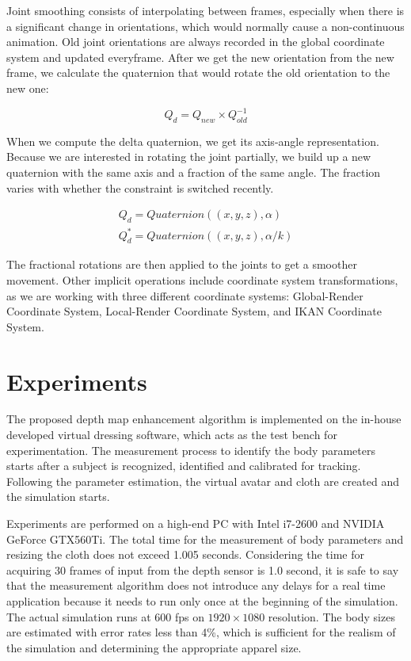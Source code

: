 \documentclass[number,preprint,review,12pt]{elsarticle}
\begin{document}
{\color{red} 
Joint smoothing consists of interpolating between frames, especially when there is a significant change in orientations, which would normally cause a non-continuous animation. Old joint orientations are always recorded in the global coordinate system and updated everyframe. After we get the new orientation from the new frame, we calculate the quaternion that would rotate the old orientation to the new one:
}

{\color{red} 
\begin{equation}
Q_{d} = Q_{new} \times Q_{old}^{-1}
\label{eqn:rotator_quaternion}
\end{equation} 
}

{\color{red} 
When we compute the delta quaternion, we get its axis-angle representation. Because we are interested in rotating the joint partially, we build up a new quaternion with the same axis and a fraction of the same angle. The fraction varies with whether the constraint is switched recently. 
}

{\color{red} 
\begin{equation} 
\begin{split}
Q_{d} = \textit{Quaternion}((x, y, z), \alpha) \\  
Q_d^* = \textit{Quaternion}((x, y, z), \alpha / k )
\label{eqn:partial_rotator}
\end{split}
\end{equation} 
}

{\color{red} 
The fractional rotations are then applied to the joints to get a smoother movement. Other implicit operations include coordinate system transformations, as we are working with three different coordinate systems: Global-Render Coordinate System, Local-Render Coordinate System, and IKAN Coordinate System. 
}

\section{Experiments}
\label{sec:Experiments}
The proposed depth map enhancement algorithm is implemented on the in-house developed virtual dressing software, which acts as the test bench for experimentation. The measurement process to identify the body parameters starts after a subject is recognized, identified and calibrated for tracking. Following the parameter estimation, the virtual avatar and cloth are created and the simulation starts.

Experiments are performed on a high-end PC with Intel i7-2600 and NVIDIA GeForce GTX560Ti. The total time for the measurement of body parameters and resizing the cloth does not exceed 1.005 seconds. Considering the time for acquiring 30 frames of input from the depth sensor is 1.0 second, it is safe to say that the measurement algorithm does not introduce any delays for a real time application because it needs to run only once at the beginning of the simulation. The actual simulation runs at 600 fps on $1920 \times 1080$ resolution. The body sizes are estimated with error rates less than 4\%, which is sufficient for the realism of the simulation and determining the appropriate apparel size. 
\end{document}
